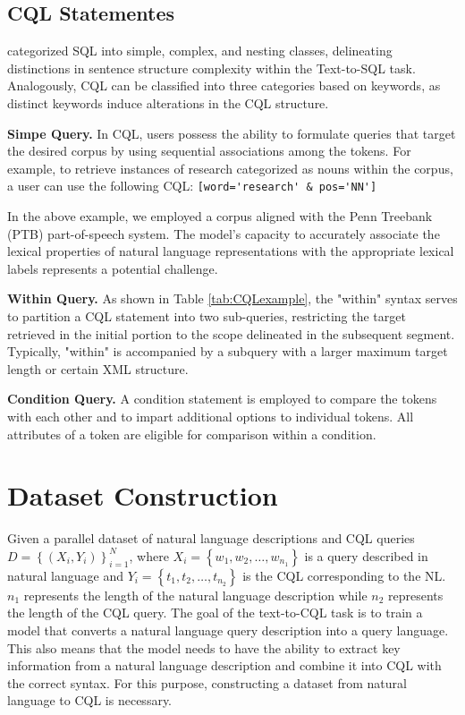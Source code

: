 \documentclass[11pt]{article}
\begin{document}
\begin{CJK*}{UTF8}{gbsn}
\subsection{CQL Statementes}
\citet{pourreza2023dinsql} categorized SQL into simple, complex, and nesting classes, delineating distinctions in sentence structure complexity within the Text-to-SQL task. Analogously, CQL can be classified into three categories based on keywords, as distinct keywords induce alterations in the CQL structure.

\textbf{Simpe Query.} In CQL, users possess the ability to formulate queries that target the desired corpus by using sequential associations among the tokens. For example, to retrieve instances of research categorized as nouns within the corpus, a user can use the following CQL:
\verb|[word='research' & pos='NN']|

In the above example, we employed a corpus aligned with the Penn Treebank (PTB) \citep{ptb} part-of-speech system. The model's capacity to accurately associate the lexical properties of natural language representations with the appropriate lexical labels represents a potential challenge.

\textbf{Within Query.} As shown in Table \ref{tab:CQLexample}, the "within" syntax serves to partition a CQL statement into two sub-queries, restricting the target retrieved in the initial portion to the scope delineated in the subsequent segment. Typically, "within" is accompanied by a subquery with a larger maximum target length or certain XML structure. 

\textbf{Condition Query.} A condition statement is employed to compare the tokens with each other and to impart additional options to individual tokens. All attributes of a token are eligible for comparison within a condition.


\section{Dataset Construction }

Given a parallel dataset of natural language descriptions and CQL queries $D = \left\{(X_i, Y_i)\right\}_{i=1}^N$, where $X_i = \left\{w_1, w_2, \ldots, w_{n_1}\right\}$ is a query described in natural language and $Y_i = \left\{t_1, t_2, \ldots, t_{n_2}\right\}$ is the CQL corresponding to the NL. $n_1$ represents the length of the natural language description while $n_2$ represents the length of the CQL query. The goal of the text-to-CQL task is to train a model that converts a natural language query description into a query language. This also means that the model needs to have the ability to extract key information from a natural language description and combine it into CQL with the correct syntax. For this purpose, constructing a dataset from natural language to CQL is necessary.


\end{CJK*}
\end{document}

